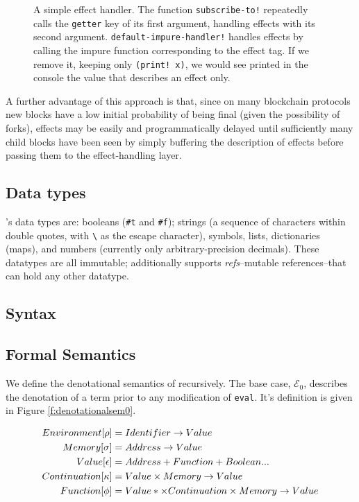 \begin{figure}[H]

    \caption{A simple effect handler. The function \texttt{subscribe-to!}
    repeatedly calls the \texttt{getter} key of its first argument, handling
    effects with its second argument. \texttt{default-impure-handler!} handles
    effects by calling the impure function corresponding to the effect tag. If
    we remove it, keeping only \texttt{(print! x)}, we would see printed in the
    console the value that describes an effect only.}
\label{f:eff-handler}
\end{figure}

A further advantage of this approach is that, since on many blockchain
protocols new blocks have a low initial probability of being final (given the
possibility of forks), effects may be easily and programmatically delayed until
sufficiently many child blocks have been seen by simply buffering the
description of effects before passing them to the effect-handling layer.

\subsection{Data types} \rad's data types are: booleans (\texttt{\#t} and
\texttt{\#f}); strings (a sequence of characters within double quotes, with
\texttt{\textbackslash} as the escape character), symbols, lists, dictionaries
(maps), and numbers (currently only arbitrary-precision decimals). These
datatypes are all immutable; additionally \rad supports \emph{refs}--mutable
references--that can hold any other datatype.

\subsection{Syntax}


\subsection{Formal Semantics} We define the denotational semantics of \rad
recursively. The base case, $\mathcal{E}_{0}$, describes the denotation of a
term prior to any modification of \texttt{eval}. It's definition is given in
Figure \ref{f:denotationalsem0}.

\begin{figure}[H]
\begin{align*}
    Environment [\rho] &= Identifier \rightarrow Value \\
    Memory [\sigma] &= Address \rightarrow Value \\
    Value [\epsilon] &= Address + Function + Boolean ... \\
    Continuation [\kappa] &= Value \times Memory \rightarrow Value \\
    Function [\phi] &= Value* \times Continuation \times Memory \rightarrow Value
\end{align*}
\label{f:denotationalsemleged}
\end{figure}


